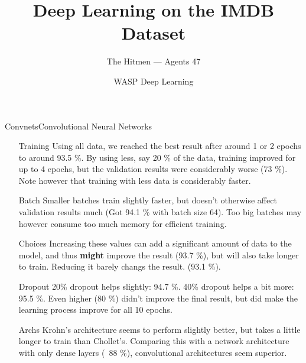 \documentclass{beamer}
\title{Deep Learning on the IMDB Dataset}
\date{WASP Deep Learning}
\author[Agents 47]{The Hitmen --- Agents 47}
\begin{document}
\begin{frame}
  \titlepage
\end{frame}


\begin{frame}{Convnets}{Convolutional Neural Networks}

  \begin{itemize}

  \item[Training] Using all data, we reached the best result after around 1 or 2
    epochs to around 93.5 \%. By using less, say 20 \% of the data, training
    improved for up to 4 epochs, but the validation results were considerably
    worse (73 \%). Note however that training with less data is considerably
    faster.

  \item[Batch] Smaller batches train slightly faster, but doesn't otherwise
    affect validation results much (Got 94.1 \% with batch size 64). Too big
    batches may however consume too much memory for efficient training.

  \end{itemize}

\end{frame}

\begin{frame}
  \begin{itemize}

  \item[Choices] Increasing these values can add a significant amount of data to
    the model, and thus \textbf{might} improve the result (93.7 \%), but will
    also take longer to train. Reducing it barely changs the result. (93.1 \%).

  \item[Dropout] 20\% dropout helps slightly: 94.7 \%.  40\% dropout helps a bit
    more: 95.5 \%. Even higher (80 \%) didn't improve the final result, but did
    make the learning process improve for all 10 epochs.

  \item[Archs] Krohn's architecture seems to perform slightly better, but takes
    a little longer to train than Chollet's. Comparing this with a network
    architecture with only dense layers (~88 \%), convolutional architectures
    seem superior.

  \end{itemize}

\end{frame}
\end{document}
